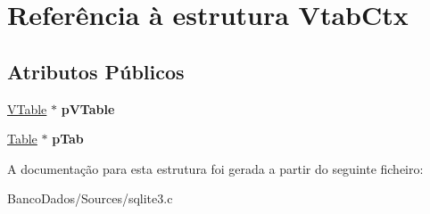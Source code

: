 \hypertarget{struct_vtab_ctx}{\section{Referência à estrutura Vtab\-Ctx}
\label{struct_vtab_ctx}
}
\subsection*{Atributos Públicos}
\begin{DoxyCompactItemize}
\item 
\hypertarget{struct_vtab_ctx_a99bbe533ea0423138d7dddba5aa662b8}{\hyperlink{struct_v_table}{V\-Table} $\ast$ {\bfseries p\-V\-Table}}\label{struct_vtab_ctx_a99bbe533ea0423138d7dddba5aa662b8}

\item 
\hypertarget{struct_vtab_ctx_a4040cb18a83afebad0ad7e7f20572b09}{\hyperlink{struct_table}{Table} $\ast$ {\bfseries p\-Tab}}\label{struct_vtab_ctx_a4040cb18a83afebad0ad7e7f20572b09}

\end{DoxyCompactItemize}


A documentação para esta estrutura foi gerada a partir do seguinte ficheiro\-:\begin{DoxyCompactItemize}
\item 
Banco\-Dados/\-Sources/sqlite3.\-c\end{DoxyCompactItemize}
